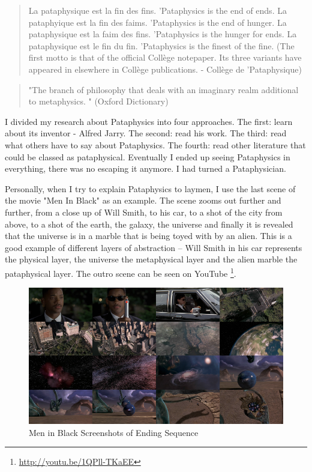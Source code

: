 \begin{quote}
  La pataphysique est la fin des fins.    		  'Pataphysics is the end of ends.
  La pataphyique est la fin des faims.                         'Pataphysics is the end of hunger.
  La pataphysique est la faim des fins.                    'Pataphysics is the hunger for ends.
  La pataphysique est le fin du fin.                          'Pataphysics is the finest of the fine.
  (The first motto is that of the official Collège notepaper. Its three variants have appeared in elsewhere in Collège publications. - Collège de 'Pataphysique) \citep{Brotchie2003}
\end{quote}

\begin{quote}
  "The branch of philosophy that deals with an imaginary realm additional to metaphysics. " (Oxford Dictionary)
\end{quote}

I divided my research about Pataphysics into four approaches. The first: learn about its inventor - Alfred Jarry. The second: read his work. The third: read what others have to say about Pataphysics. The fourth: read other literature that could be classed as pataphysical. Eventually I ended up seeing Pataphysics in everything, there was no escaping it anymore. I had turned a Pataphysician.

Personally, when I try to explain Pataphysics to laymen, I use the last scene of the movie "Men In Black" as an example. The scene zooms out further and further, from a close up of Will Smith, to his car, to a shot of the city from above, to a shot of the earth, the galaxy, the universe and finally it is revealed that the universe is in a marble that is being toyed with by an alien. This is a good example of different layers of abstraction – Will Smith in his car represents the physical layer, the universe the metaphysical layer and the alien marble the pataphysical layer. The outro scene can be seen on YouTube \footnote{\url{http://youtu.be/1QPll-TKaEE}}.

\begin{figure}[!htb] %
  \centering
  \includegraphics[width=\textwidth]{images/mibwide}
  \caption[Men in Black]{Men in Black Screenshots of Ending Sequence}
  \label{fig:MIB}
\end{figure}


